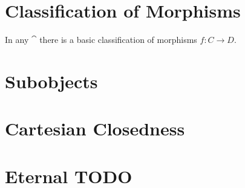 \documentclass[a4paper,12pt,fleqn]{scrartcl}  %
\begin{document}
\begin{appendices}
\newpage
\section{Classification of Morphisms}
	In any $\cat$ there is a basic classification of morphisms $f: C \rightarrow D$.\\
	

	

\newpage
\section{Subobjects}

\newpage
\section{Cartesian Closedness}



\section{Eternal TODO}
	
	
	



\end{appendices}
			\nocite{*}
			
			
\end{document}
